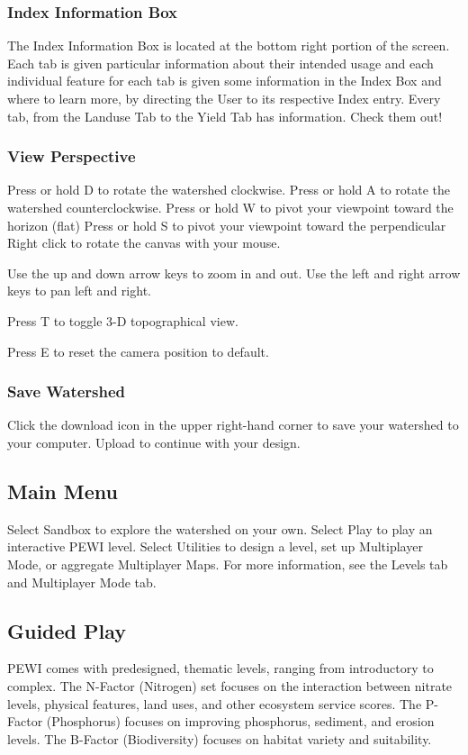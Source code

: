 \documentclass[11pt]{article}
\begin{document}
\subsubsection{Index Information Box}
The Index Information Box is located at the bottom right portion of the screen. Each tab is given particular information about their intended usage and each individual feature for each tab is given some information in the Index Box and where to learn more, by directing the User to its respective Index entry. Every tab, from the Landuse Tab to the Yield Tab has information. Check them out! 

\subsubsection{View Perspective}
Press or hold D to rotate the watershed clockwise.
Press or hold A to rotate the watershed counterclockwise.
Press or hold W to pivot your viewpoint toward the horizon (flat)
Press or hold S to pivot your viewpoint toward the perpendicular
Right click to rotate the canvas with your mouse.

Use the up and down arrow keys to zoom in and out.
Use the left and right arrow keys to pan left and right.

Press T to toggle 3-D topographical view.

Press E to reset the camera position to default.

\subsubsection{Save Watershed}
Click the download icon in the upper right-hand corner to save your watershed to your computer. Upload to continue with your design.

\subsection{Main Menu}
Select Sandbox to explore the watershed on your own.
Select Play to play an interactive PEWI level.
Select Utilities to design a level, set up Multiplayer Mode, or aggregate Multiplayer Maps.
For more information, see the Levels tab and Multiplayer Mode tab.

\subsection{Guided Play}
PEWI comes with predesigned, thematic levels, ranging from introductory to complex. The N-Factor (Nitrogen) set focuses on the interaction between nitrate levels, physical features, land uses, and other ecosystem service scores. The P-Factor (Phosphorus) focuses on improving phosphorus, sediment, and erosion levels. The B-Factor (Biodiversity) focuses on habitat variety and suitability.
\end{document}
